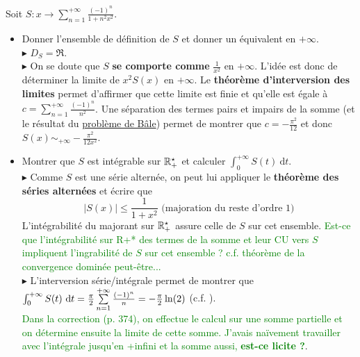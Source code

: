 Soit $S:x \to \sum\limits_{n=1}^{+\infty} \frac{(-1)^n}{1+n^2 x^2}$.
\begin{itemize}
    \item Donner l'ensemble de définition de $S$ et donner un équivalent en $+\infty$.\\
    $\blacktriangleright$  $D_S = \Re$.\\
    $\blacktriangleright$ On se doute que $S$ \textbf{se comporte comme} $\frac{1}{x^2}$ en $+\infty$. L'idée est donc de déterminer la limite de $x^2 S(x)$ en $+\infty$. Le \textbf{théorème d'interversion des limites} permet d'affirmer que cette limite est finie et qu'elle est égale à $c = \sum\limits_{n=1}^{+\infty} \frac{(-1)^n}{n^2}$. Une séparation des termes pairs et impairs de la somme (et le résultat du \href{https://fr.wikipedia.org/wiki/Problème_de_Bâle}{problème de Bâle}) permet de montrer que $c = -\frac{\pi^2}{12}$ et donc $S(x) \sim_{+\infty} -\frac{\pi^2}{12x^2}$.
    \item Montrer que $S$ est intégrable sur $\mathbb{R}^\star_+$ et calculer $\int_0^{+\infty} S(t)\ \mathrm{d}t$.\\
    $\blacktriangleright$ Comme $S$ est une série alternée, on peut lui appliquer le \textbf{théorème des séries alternées} et écrire que 
    $$|S(x)| \leqslant \frac{1}{1+x^2} \text{ (majoration du reste d'ordre 1)}$$
    L'intégrabilité du majorant sur $\mathbb{R}^\star_+$ assure celle de $S$ sur cet ensemble. \textcolor{green}{Est-ce que l'intégrabilité sur R+* des termes de la somme et leur CU vers $S$ impliquent l'ingrabilité de $S$ sur cet ensemble ? c.f. théorème de la convergence dominée peut-être...}\\
    $\blacktriangleright$ L'interversion série/intégrale permet de montrer que $\int_0^{+\infty} S(t)\ \mathrm{d} t = \frac{\pi}{2} \sum\limits_{n=1}^{+\infty} \frac{(-1)^n}{n} = -\frac{\pi}{2} \ln(2)$ (c.f. ).\\
    \textcolor{green}{Dans la correction (p. 374), on effectue le calcul sur une somme partielle et on détermine ensuite la limite de cette somme. J'avais naïvement travailler avec l'intégrale jusqu'en +infini et la somme aussi, \textbf{est-ce licite ?}}.
\end{itemize}